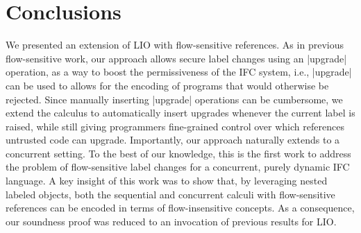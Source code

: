 \section{Conclusions}
\label{sec:conclusion}

We presented an extension of LIO with flow-sensitive references.
%
As in previous flow-sensitive work, our approach allows secure label
changes using an |upgrade| operation, as a way to boost the
permissiveness of the IFC system, i.e., |upgrade| can be used to
allows for the encoding of programs that would otherwise be rejected.
%
Since manually inserting |upgrade| operations can be cumbersome, we
extend the calculus to automatically insert upgrades whenever the
current label is raised, while still giving programmers fine-grained
control over which references untrusted code can upgrade.
%
Importantly, our approach naturally extends to a concurrent setting.
%
To the best of our knowledge, this is the first work to address the
problem of flow-sensitive label changes for a concurrent, purely
dynamic IFC language.
%
A key insight of this work was to show that, by leveraging nested
labeled objects, both the sequential and concurrent calculi with
flow-sensitive references can be encoded in terms of flow-insensitive
concepts.
%
As a consequence, our soundness proof was reduced to an invocation of
previous results for LIO.


